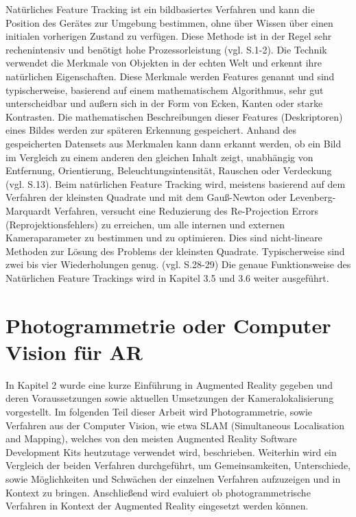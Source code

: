 Natürliches Feature Tracking ist ein bildbasiertes Verfahren und kann die Position des Gerätes zur Umgebung bestimmen, ohne über Wissen über einen initialen vorherigen Zustand zu verfügen. Diese Methode ist in der Regel sehr rechenintensiv und benötigt hohe Prozessorleistung (vgl. \cite{model_based} S.1-2). Die Technik verwendet die Merkmale von Objekten in der echten Welt und erkennt ihre natürlichen Eigenschaften. Diese Merkmale werden \glqq Features\grqq{} genannt und sind typischerweise, basierend auf einem mathematischem Algorithmus, sehr gut unterscheidbar und außern sich in der Form von Ecken, Kanten oder starke Kontrasten. Die mathematischen Beschreibungen dieser Features (Deskriptoren) eines Bildes werden zur späteren Erkennung gespeichert. Anhand des gespeicherten Datensets aus Merkmalen kann dann erkannt werden, ob ein Bild im Vergleich zu einem anderen den gleichen Inhalt zeigt, unabhängig von Entfernung, Orientierung, Beleuchtungsintensität, Rauschen oder Verdeckung (vgl. \cite{comparative_sdks} S.13). Beim natürlichen Feature Tracking wird, meistens basierend auf dem Verfahren der kleinsten Quadrate und mit dem Gauß-Newton oder Levenberg-Marquardt Verfahren, versucht eine Reduzierung des \glqq Re-Projection Errors\grqq{} (Reprojektionsfehlers) zu erreichen, um alle internen und externen Kameraparameter zu bestimmen und zu optimieren. Dies sind nicht-lineare Methoden zur Lösung des Problems der kleinsten Quadrate. Typischerweise sind zwei bis vier Wiederholungen genug. (vgl. \cite{natural_feature} S.28-29) Die genaue Funktionsweise des Natürlichen Feature Trackings wird in Kapitel 3.5 und 3.6 weiter ausgeführt.
 

\section{Photogrammetrie oder Computer Vision für AR}

In Kapitel 2 wurde eine kurze Einführung in Augmented Reality gegeben und deren Voraussetzungen sowie aktuellen Umsetzungen der Kameralokalisierung vorgestellt. Im folgenden Teil dieser Arbeit wird Photogrammetrie, sowie Verfahren aus der Computer Vision, wie etwa SLAM (Simultaneous Localisation and Mapping), welches von den meisten Augmented Reality Software Development Kits heutzutage verwendet wird, beschrieben. Weiterhin wird ein Vergleich der beiden Verfahren durchgeführt, um Gemeinsamkeiten, Unterschiede, sowie Möglichkeiten und Schwächen der einzelnen Verfahren aufzuzeigen und in Kontext zu bringen. Anschließend wird evaluiert ob photogrammetrische Verfahren in Kontext der Augmented Reality eingesetzt werden können.

